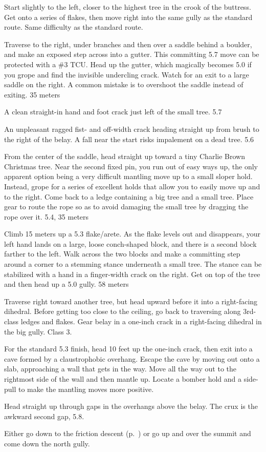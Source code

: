 \documentclass{tahquitz}
\begin{document}
 Start slightly to the left, closer to the highest tree in the crook of
the buttress. Get onto a series of flakes, then move right into the same gully as the standard route. Same
difficulty as the standard route.

 Traverse to the right, under branches and then over a saddle behind a boulder, and make
an exposed step across into a gutter. This committing 5.7 move can be protected with a
\#3 TCU. Head up the gutter, which magically becomes 5.0 if you grope and find the invisible
undercling crack. Watch for an exit to a large saddle
on the right. A common mistake is to overshoot the saddle instead of
exiting. 35 meters

 A clean straight-in hand and foot crack just left of the small
tree. 5.7

 An unpleasant ragged fist- and off-width crack heading straight up from brush
to the right of the belay. A fall near the start risks impalement on a dead tree. 5.6

 From the center of the saddle, head straight up toward a tiny Charlie Brown Christmas
tree. Near the second fixed pin, you run out of easy ways up, the
only apparent option being a very difficult mantling move up to a
small sloper hold. Instead, grope for a series of excellent holds that allow
you to easily move up and to the right. Come back to a ledge containing a big tree and
a small tree. Place
gear to route the rope so as to avoid damaging the small tree by dragging
the rope over it. 5.4, 35 meters

 Climb 15 meters up a 5.3 flake/arete. As the flake levels out and
disappears, your left hand lands on a large, loose conch-shaped block,
and there is a second block farther to the left. Walk across the two
blocks and make a committing step around a corner to a stemming stance
underneath a small tree. The stance can be stabilized with a hand in a
finger-width crack on the right. Get on top of the tree and then head
up a 5.0 gully. 58 meters

 Traverse right toward another tree, but head upward before
it into a right-facing dihedral.  Before getting too close to the ceiling, go back to traversing
along 3rd-class ledges and flakes.  Gear belay in a one-inch
crack in a right-facing dihedral in the big gully. Class 3.

 For the standard 5.3 finish, head 10 feet up the one-inch crack,
then exit into a cave formed by a claustrophobic overhang.
Escape the cave by moving out onto a slab, approaching
a wall that gets in the way.
Move all the way out to the rightmost side of
the wall and then mantle up. Locate a bomber hold and a side-pull to make
the mantling moves more positive.

 Head straight up through gaps in the overhangs above
the belay. The crux is the awkward second gap, 5.8.

\somespace

\descent Either go down to the friction descent (p.~\pageref{subsec:friction-descent})
or go up and over the summit
and come down the north gully.

\myfooter\vfill %
\end{document}
